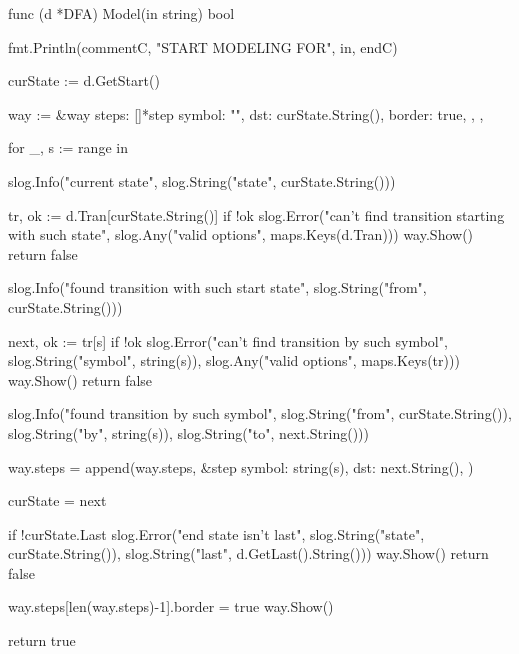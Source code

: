 func (d *DFA) Model(in string) bool {
	fmt.Println(commentC, "START MODELING FOR", in, endC)

	curState := d.GetStart()

	way := &way{
		steps: []*step{
			{
				symbol: "",
				dst:    curState.String(),
				border: true,
			},
		},
	}

	for _, s := range in {
		slog.Info("current state", slog.String("state", curState.String()))

		tr, ok := d.Tran[curState.String()]
		if !ok {
			slog.Error("can't find transition starting with such state", slog.Any("valid options", maps.Keys(d.Tran)))
			way.Show()
			return false
		}

		slog.Info("found transition with such start state", slog.String("from", curState.String()))

		next, ok := tr[s]
		if !ok {
			slog.Error("can't find transition by such symbol", slog.String("symbol", string(s)),
				slog.Any("valid options", maps.Keys(tr)))
			way.Show()
			return false
		}

		slog.Info("found transition by such symbol", slog.String("from", curState.String()),
			slog.String("by", string(s)), slog.String("to", next.String()))

		way.steps = append(way.steps, &step{
			symbol: string(s),
			dst:    next.String(),
		})

		curState = next
	}

	if !curState.Last {
		slog.Error("end state isn't last", slog.String("state", curState.String()),
			slog.String("last", d.GetLast().String()))
		way.Show()
		return false
	}

	way.steps[len(way.steps)-1].border = true
	way.Show()

	return true
}
